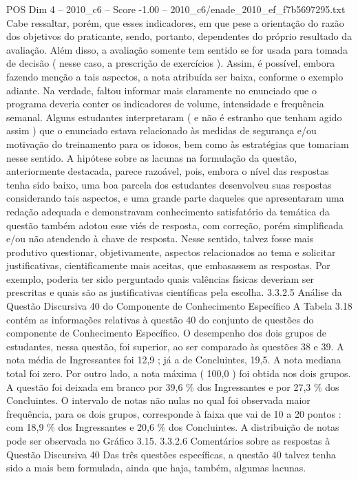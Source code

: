 \begin{textsample}{POS Dim 4 – 2010\_c6 – Score -1.00 – 2010\_c6/enade\_2010\_ef\_f7b5697295.txt}
Cabe ressaltar, porém, que esses indicadores, em que pese a orientação do razão dos objetivos do praticante, sendo, portanto, dependentes do próprio resultado da avaliação.
Além disso, a avaliação somente tem sentido se for usada para tomada de decisão ( nesse caso, a prescrição de exercícios ).
Assim, é possível, embora fazendo menção a tais aspectos, a nota atribuída ser baixa, conforme o exemplo adiante.
Na verdade, faltou informar mais claramente no enunciado que o programa deveria conter os indicadores de volume, intensidade e frequência semanal.
Alguns estudantes interpretaram ( e não é estranho que tenham agido assim ) que o enunciado estava relacionado às medidas de segurança e/ou motivação do treinamento para os idosos, bem como às estratégias que tomariam nesse sentido.
A hipótese sobre as lacunas na formulação da questão, anteriormente destacada, parece razoável, pois, embora o nível das respostas tenha sido baixo, uma boa parcela dos estudantes desenvolveu suas respostas considerando tais aspectos, e uma grande parte daqueles que apresentaram uma redação adequada e demonstravam conhecimento satisfatório da temática da questão também adotou esse viés de resposta, com correção, porém simplificada e/ou não atendendo à chave de resposta.
Nesse sentido, talvez fosse mais produtivo questionar, objetivamente, aspectos relacionados ao tema e solicitar justificativas, cientificamente mais aceitas, que embasassem as respostas.
Por exemplo, poderia ter sido perguntado quais valências físicas deveriam ser prescritas e quais são as justificativas científicas pela escolha. 3.3.2.5 Análise da Questão Discursiva 40 do Componente de Conhecimento Específico A Tabela 3.18 contém as informações relativas à questão 40 do conjunto de questões do componente de Conhecimento Específico.
O desempenho dos dois grupos de estudantes, nessa questão, foi superior, ao ser comparado às questões 38 e 39.
A nota média de Ingressantes foi 12,9 ; já a de Concluintes, 19,5.
A nota mediana total foi zero.
Por outro lado, a nota máxima ( 100,0 ) foi obtida nos dois grupos.
A questão foi deixada em branco por 39,6 \% dos Ingressantes e por 27,3 \% dos Concluintes.
O intervalo de notas não nulas no qual foi observada maior frequência, para os dois grupos, corresponde à faixa que vai de 10 a 20 pontos : com 18,9 \% dos Ingressantes e 20,6 \% dos Concluintes.
A distribuição de notas pode ser observada no Gráfico 3.15. 3.3.2.6 Comentários sobre as respostas à Questão Discursiva 40 Das três questões específicas, a questão 40 talvez tenha sido a mais bem formulada, ainda que haja, também, algumas lacunas.

\end{textsample}
